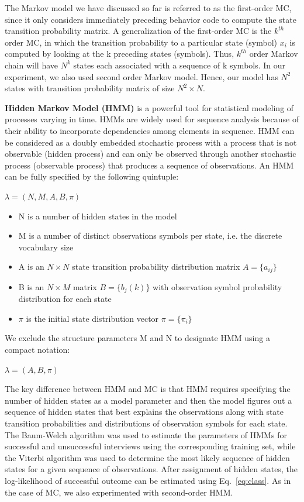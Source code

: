 \documentclass{amia}
\begin{document}
The Markov model we have discussed so far is referred to as the first-order MC, since it only considers immediately preceding behavior code to compute the state transition probability matrix. A generalization of the first-order MC is the $k^{th}$ order MC, in which the transition probability to a particular state (symbol) $x_i$ is computed by looking at the k preceding states (symbols). Thus, $k^{th}$ order Markov chain will have $N^{k}$ states each associated with a sequence of k symbols. In our experiment, we also used second order Markov model. Hence, our model has $N^2$ states with transition probability matrix of size $N^2 \times N$.  

\textbf {Hidden Markov Model (HMM)} is a powerful tool for statistical modeling of processes varying in time. HMMs are widely used for sequence analysis because of their ability to incorporate dependencies among elements in sequence. HMM can be considered as a doubly embedded stochastic process with a process that is not observable (hidden process) and can only be observed through another stochastic process (observable process) that produces a sequence of observations. An HMM can be fully specified by the following quintuple:

\begin{center}
$\lambda = (N, M, A, B, \pi)$
\end{center}

\begin{itemize}
\item N is a number of hidden states in the model
\item M is a number of distinct observations symbols per state, i.e. the discrete vocabulary size
\item A is an $N\times N$ state transition probability distribution matrix $A = \{a_{ij}\}$
\item B is an $N\times M$ matrix $B = \{b_j(k)\}$ with observation symbol probability distribution for each state 
\item $\pi$ is the initial state distribution vector $\pi = \{\pi_i\}$
\end{itemize}

We exclude the structure parameters M and N to designate HMM using a compact notation:

\begin{center}
$\lambda = (A, B, \pi)$
\end{center} 

The key difference between HMM and MC is that HMM requires specifying the number of hidden states as a model parameter and then the model figures out a sequence of hidden states that best explains the observations along with state transition probabilities and distributions of observation symbols for each state. The Baum-Welch algorithm was used to estimate the parameters of HMMs for successful and unsuccessful interviews using the corresponding training set, while the Viterbi algorithm was used to determine the most likely sequence of hidden states for a given sequence of observations. After assignment of hidden states, the log-likelihood of successful outcome can be estimated using Eq.~\ref{eq:class}. As in the case of MC, we also experimented with second-order HMM.   
\end{document}
